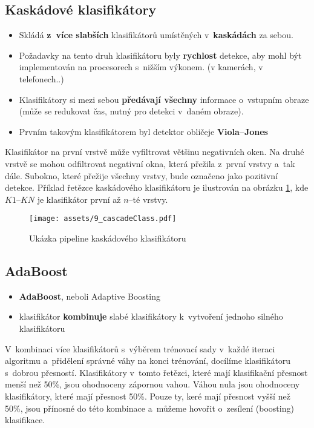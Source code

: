 \subsection{Kaskádové klasifikátory} %
\begin{itemize}
    \item Skládá \textbf{z~více slabších} klasifikátorů umístěných v~\textbf{kaskádách} za sebou.
    \item Požadavky na tento druh klasifikátoru byly \textbf{rychlost} detekce, aby mohl být implementován na procesorech s~nižším výkonem. (v kamerách, v telefonech..)
    \item Klasifikátory si mezi sebou \textbf{předávají všechny} informace o~vstupním obraze (může se redukovat čas, nutný pro detekci v~daném obraze).
    \item Prvním takovým klasifikátorem byl detektor obličeje \textbf{Viola--Jones}
\end{itemize}
Klasifikátor na první vrstvě může vyfiltrovat většinu negativních oken. Na druhé vrstvě se mohou odfiltrovat  negativní okna, která přežila z~první vrstvy a~tak dále. Subokno, které přežije všechny vrstvy, bude označeno jako pozitivní detekce. Příklad řetězce kaskádového klasifikátoru je ilustrován na obrázku \ref{fig:ccpipeline}, kde $K1$--$KN$ je klasifikátor první až $n$--té vrstvy.

\begin{figure}[H]
    \centering
    \texttt{[image: assets/9\_cascadeClass.pdf]}
    \caption{Ukázka pipeline kaskádového klasifikátoru}
    \label{fig:ccpipeline}
\end{figure}

\subsection{AdaBoost}
\begin{itemize}
    \item \textbf{AdaBoost}, neboli Adaptive Boosting
    \item klasifikátor \textbf{kombinuje} slabé klasifikátory k~vytvoření jednoho silného klasifikátoru
\end{itemize}
V~kombinaci více klasifikátorů s~výběrem trénovací sady v~každé iteraci algoritmu a~přidělení správné váhy na konci trénování, docílíme klasifikátoru s~dobrou přesností. Klasifikátory v~tomto řetězci, které mají klasifikační přesnost menší než 50\%, jsou ohodnoceny zápornou vahou. Váhou nula jsou ohodnoceny klasifikátory, které mají přesnost 50\%. Pouze ty, keré mají přesnost vyšší než 50\%, jsou přínosné do této kombinace a~můžeme hovořit o~zesílení (boosting) klasifikace.

